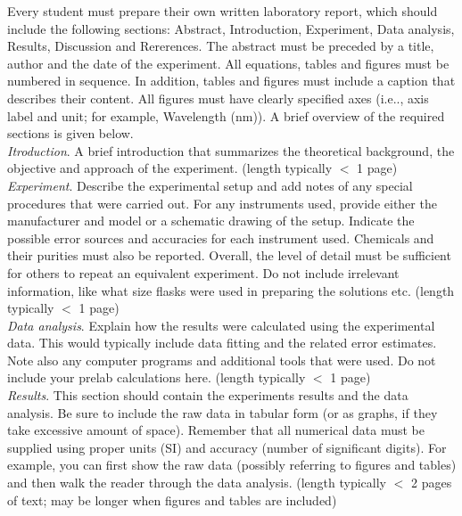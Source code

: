\documentclass[byrevtex,amssymb,aps,pra,floatfix,letterpaper]{revtex4}
\begin{document}
Every student must prepare their own written laboratory report, which should include the following sections: Abstract, Introduction, Experiment, Data analysis, Results, Discussion and Rererences. The abstract must be preceded by a title, author and the date of the experiment. All equations, tables and figures must be numbered in sequence. In addition, tables and figures must include a caption that describes their content. All figures must have clearly specified axes (i.e.., axis label and unit; for example, Wavelength (nm)). A brief overview of the required sections is given below.\\

\noindent
\textit{Itroduction}. A brief introduction that summarizes the theoretical background, the objective
and approach of the experiment. (length typically $<$ 1 page)\\

\noindent
\textit{Experiment}. Describe the experimental setup and add notes of any special procedures that were
carried out. For any instruments used, provide either the manufacturer and model or a schematic drawing of the setup. Indicate the possible error sources and accuracies for each instrument used. Chemicals and their purities must also be reported. Overall, the level of detail must be sufficient for others to repeat an equivalent experiment. Do not include irrelevant information, like what size flasks were used in preparing the solutions etc. (length typically $<$ 1 page)\\

\noindent
\textit{Data analysis}. Explain how the results were calculated using the experimental data. This would typically include data fitting and the related error estimates. Note also any computer programs and additional tools that were used. Do not include your prelab calculations here. (length typically $<$ 1 page)\\

\noindent
\textit{Results}. This section should contain the experiments results and the data analysis. Be sure to include the
raw data in tabular form (or as graphs, if they take excessive amount of space). Remember that all numerical data must be supplied using proper units (SI) and accuracy (number of significant digits). For example, you can first show the raw data (possibly referring to figures and tables) and then walk the reader through the data analysis. (length typically $<$ 2 pages of text; may be longer when figures and tables are included)\\
\end{document}
